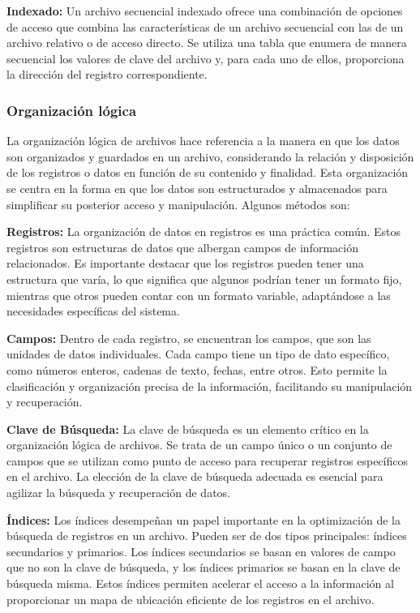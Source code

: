 \documentclass[11pt, twocolumn]{article}
\begin{document}
  \textbf{Indexado:} Un archivo secuencial indexado ofrece una combinación de opciones de acceso que combina las características de un archivo secuencial con las de un archivo relativo o de acceso directo. Se utiliza una tabla que enumera de manera secuencial los valores de clave del archivo y, para cada uno de ellos, proporciona la dirección del registro correspondiente.

  \subsubsection*{Organización lógica}
  La organización lógica de archivos hace referencia a la manera en que los datos son organizados y guardados en un archivo, considerando la relación y disposición de los registros o datos en función de su contenido y finalidad. Esta organización se centra en la forma en que los datos son estructurados y almacenados para simplificar su posterior acceso y manipulación. Algunos métodos son:

  \textbf{Registros:} La organización de datos en registros es una práctica común. Estos registros son estructuras de datos que albergan campos de información relacionados. Es importante destacar que los registros pueden tener una estructura que varía, lo que significa que algunos podrían tener un formato fijo, mientras que otros pueden contar con un formato variable, adaptándose a las necesidades específicas del sistema.

  \textbf{Campos:} Dentro de cada registro, se encuentran los campos, que son las unidades de datos individuales. Cada campo tiene un tipo de dato específico, como números enteros, cadenas de texto, fechas, entre otros. Esto permite la clasificación y organización precisa de la información, facilitando su manipulación y recuperación.

  \textbf{Clave de Búsqueda:} La clave de búsqueda es un elemento crítico en la organización lógica de archivos. Se trata de un campo único o un conjunto de campos que se utilizan como punto de acceso para recuperar registros específicos en el archivo. La elección de la clave de búsqueda adecuada es esencial para agilizar la búsqueda y recuperación de datos.

  \textbf{Índices:} Los índices desempeñan un papel importante en la optimización de la búsqueda de registros en un archivo. Pueden ser de dos tipos principales: índices secundarios y primarios. Los índices secundarios se basan en valores de campo que no son la clave de búsqueda, y los índices primarios se basan en la clave de búsqueda misma. Estos índices permiten acelerar el acceso a la información al proporcionar un mapa de ubicación eficiente de los registros en el archivo.
\end{document}
